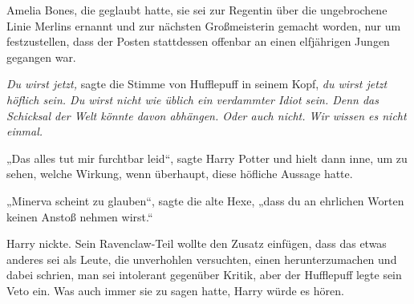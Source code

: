 Amelia Bones, die geglaubt hatte, sie sei zur Regentin über die ungebrochene Linie Merlins ernannt und zur nächsten Großmeisterin gemacht worden, nur um festzustellen, dass der Posten stattdessen offenbar an einen elfjährigen Jungen gegangen war.

\emph{Du wirst jetzt,} sagte die Stimme von Hufflepuff in seinem Kopf, \emph{du wirst jetzt höflich sein. Du wirst nicht wie üblich ein verdammter Idiot sein. Denn das Schicksal der Welt könnte davon abhängen. Oder auch nicht. Wir wissen es nicht einmal.}

„Das alles tut mir furchtbar leid“, sagte Harry Potter und hielt dann inne, um zu sehen, welche Wirkung, wenn überhaupt, diese höfliche Aussage hatte.

„Minerva scheint zu glauben“, sagte die alte Hexe, „dass du an ehrlichen Worten keinen Anstoß nehmen wirst.“

Harry nickte.
Sein Ravenclaw-Teil wollte den Zusatz einfügen, dass das etwas anderes sei als Leute, die unverhohlen versuchten, einen herunterzumachen und dabei schrien, man sei intolerant gegenüber Kritik, aber der Hufflepuff legte sein Veto ein. Was auch immer sie zu sagen hatte, Harry würde es hören.


